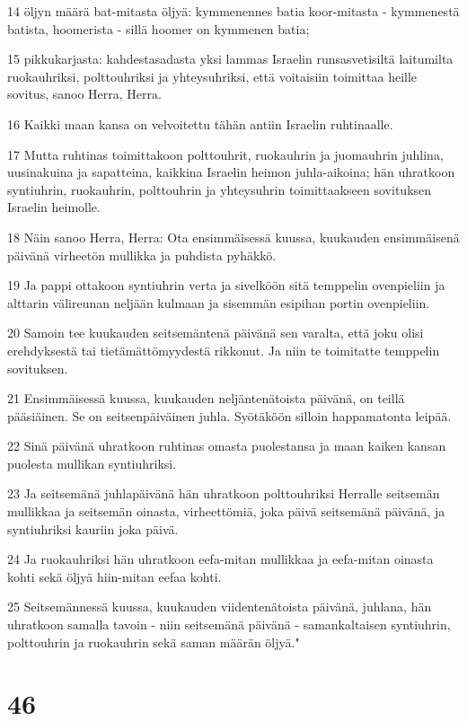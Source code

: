 \par 14 öljyn määrä bat-mitasta öljyä: kymmenennes batia koor-mitasta - kymmenestä batista, hoomerista - sillä hoomer on kymmenen batia;
\par 15 pikkukarjasta: kahdestasadasta yksi lammas Israelin runsasvetisiltä laitumilta ruokauhriksi, polttouhriksi ja yhteysuhriksi, että voitaisiin toimittaa heille sovitus, sanoo Herra, Herra.
\par 16 Kaikki maan kansa on velvoitettu tähän antiin Israelin ruhtinaalle.
\par 17 Mutta ruhtinas toimittakoon polttouhrit, ruokauhrin ja juomauhrin juhlina, uusinakuina ja sapatteina, kaikkina Israelin heimon juhla-aikoina; hän uhratkoon syntiuhrin, ruokauhrin, polttouhrin ja yhteysuhrin toimittaakseen sovituksen Israelin heimolle.
\par 18 Näin sanoo Herra, Herra: Ota ensimmäisessä kuussa, kuukauden ensimmäisenä päivänä virheetön mullikka ja puhdista pyhäkkö.
\par 19 Ja pappi ottakoon syntiuhrin verta ja sivelköön sitä temppelin ovenpieliin ja alttarin välireunan neljään kulmaan ja sisemmän esipihan portin ovenpieliin.
\par 20 Samoin tee kuukauden seitsemäntenä päivänä sen varalta, että joku olisi erehdyksestä tai tietämättömyydestä rikkonut. Ja niin te toimitatte temppelin sovituksen.
\par 21 Ensimmäisessä kuussa, kuukauden neljäntenätoista päivänä, on teillä pääsiäinen. Se on seitsenpäiväinen juhla. Syötäköön silloin happamatonta leipää.
\par 22 Sinä päivänä uhratkoon ruhtinas omasta puolestansa ja maan kaiken kansan puolesta mullikan syntiuhriksi.
\par 23 Ja seitsemänä juhlapäivänä hän uhratkoon polttouhriksi Herralle seitsemän mullikkaa ja seitsemän oinasta, virheettömiä, joka päivä seitsemänä päivänä, ja syntiuhriksi kauriin joka päivä.
\par 24 Ja ruokauhriksi hän uhratkoon eefa-mitan mullikkaa ja eefa-mitan oinasta kohti sekä öljyä hiin-mitan eefaa kohti.
\par 25 Seitsemännessä kuussa, kuukauden viidentenätoista päivänä, juhlana, hän uhratkoon samalla tavoin - niin seitsemänä päivänä - samankaltaisen syntiuhrin, polttouhrin ja ruokauhrin sekä saman määrän öljyä."

\chapter{46}

